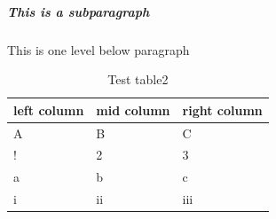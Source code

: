 \subparagraph{This is a subparagraph}
This is one level below paragraph

\begin{center}
\begin{table}[h]%
\centering
\begin{tabular}{lll}%
	\hline %
	\textbf{left column} & \textbf{mid column} & \textbf{right column} \\
	\hline
	A & B & C \\
	! & 2 & 3 \\
	a & b & c \\
	i & ii & iii \\
	\hline
\end{tabular}
\caption{Test table2}
\label{tab:threecols2}
\end{table}
\end{center}
    


